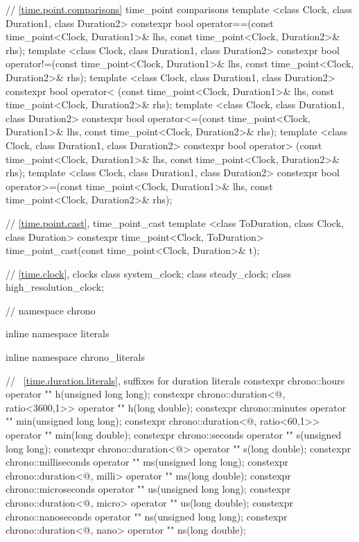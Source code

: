 \begin{codeblock}
{{// \ref{time.point.comparisons} time_point comparisons
template <class Clock, class Duration1, class Duration2>
   constexpr bool operator==(const time_point<Clock, Duration1>& lhs,
                             const time_point<Clock, Duration2>& rhs);
template <class Clock, class Duration1, class Duration2>
   constexpr bool operator!=(const time_point<Clock, Duration1>& lhs,
                             const time_point<Clock, Duration2>& rhs);
template <class Clock, class Duration1, class Duration2>
   constexpr bool operator< (const time_point<Clock, Duration1>& lhs,
                             const time_point<Clock, Duration2>& rhs);
template <class Clock, class Duration1, class Duration2>
   constexpr bool operator<=(const time_point<Clock, Duration1>& lhs,
                             const time_point<Clock, Duration2>& rhs);
template <class Clock, class Duration1, class Duration2>
   constexpr bool operator> (const time_point<Clock, Duration1>& lhs,
                             const time_point<Clock, Duration2>& rhs);
template <class Clock, class Duration1, class Duration2>
   constexpr bool operator>=(const time_point<Clock, Duration1>& lhs,
                             const time_point<Clock, Duration2>& rhs);

// \ref{time.point.cast}, time_point_cast
template <class ToDuration, class Clock, class Duration>
  constexpr time_point<Clock, ToDuration>
  time_point_cast(const time_point<Clock, Duration>& t);

// \ref{time.clock}, clocks
class system_clock;
class steady_clock;
class high_resolution_clock;

}  // namespace chrono

inline namespace literals {
inline namespace chrono_literals {

// ~\ref{time.duration.literals}, suffixes for duration literals
constexpr chrono::hours                                 operator "" h(unsigned long long);
constexpr chrono::duration<@\unspec@, ratio<3600,1>> operator "" h(long double);
constexpr chrono::minutes                               operator "" min(unsigned long long);
constexpr chrono::duration<@\unspec@, ratio<60,1>>   operator "" min(long double);
constexpr chrono::seconds                               operator "" s(unsigned long long);
constexpr chrono::duration<@\unspec@>                operator "" s(long double);
constexpr chrono::milliseconds                          operator "" ms(unsigned long long);
constexpr chrono::duration<@\unspec@, milli>         operator "" ms(long double);
constexpr chrono::microseconds                          operator "" us(unsigned long long);
constexpr chrono::duration<@\unspec@, micro>         operator "" us(long double);
constexpr chrono::nanoseconds                           operator "" ns(unsigned long long);
constexpr chrono::duration<@\unspec@, nano>          operator "" ns(long double);

}}}
\end{codeblock}
